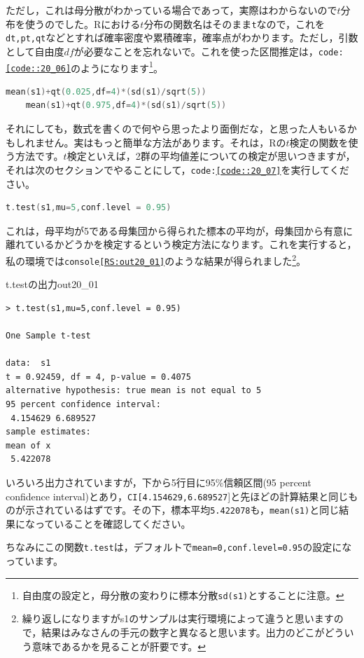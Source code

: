 \documentclass{ltjsbook}
\begin{document}
ただし，これは母分散がわかっている場合であって，実際はわからないので$t$分布を使うのでした。Rにおける$t$分布の関数名はそのまま\texttt{t}なので，これを\texttt{dt,pt,qt}などとすれば確率密度や累積確率，確率点がわかります。ただし，引数として自由度$df$が必要なことを忘れないで。これを使った区間推定は，\texttt{code:\ref{code::20_06}}のようになります\footnote{自由度の設定と，母分散の変わりに標本分散\texttt{sd(s1)}とすることに注意。}。
\begin{lstlisting}[language=c++,label={code::20_06},caption={母分散がわからない場合}]
    mean(s1)+qt(0.025,df=4)*(sd(s1)/sqrt(5))
    mean(s1)+qt(0.975,df=4)*(sd(s1)/sqrt(5))
\end{lstlisting}
それにしても，数式を書くので何やら思ったより面倒だな，と思った人もいるかもしれません。実はもっと簡単な方法があります。それは，Rの$t$検定の関数を使う方法です。$t$検定といえば，2群の平均値差についての検定が思いつきますが，それは次のセクションでやることにして，\texttt{code:\ref{code::20_07}}を実行してください。
\begin{lstlisting}[language=c++,label={code::20_07},caption={t.test関数で推定}]
    t.test(s1,mu=5,conf.level = 0.95)
\end{lstlisting}
これは，母平均が5である母集団から得られた標本の平均が，母集団から有意に離れているかどうかを検定するという検定方法になります。これを実行すると，私の環境では\texttt{console\ref{RS:out20_01}}のような結果が得られました\footnote{繰り返しになりますがs1のサンプルは実行環境によって違うと思いますので，結果はみなさんの手元の数字と異なると思います。出力のどこがどういう意味であるかを見ることが肝要です。}。

\begin{Rscreen}{t.testの出力}{out20_01}
\begin{verbatim}
> t.test(s1,mu=5,conf.level = 0.95)

One Sample t-test

data:  s1
t = 0.92459, df = 4, p-value = 0.4075
alternative hypothesis: true mean is not equal to 5
95 percent confidence interval:
 4.154629 6.689527
sample estimates:
mean of x 
 5.422078
\end{verbatim}
\end{Rscreen}
いろいろ出力されていますが，下から5行目に95\%信頼区間(95 percent confidence interval)とあり，\texttt{CI[4.154629,6.689527}]と先ほどの計算結果と同じものが示されているはずです。その下，標本平均\texttt{5.422078}も，\texttt{mean(s1)}と同じ結果になっていることを確認してください。

ちなみにこの関数\texttt{t.test}は，デフォルトで\texttt{mean=0,conf.level=0.95}の設定になっています。
\end{document}
